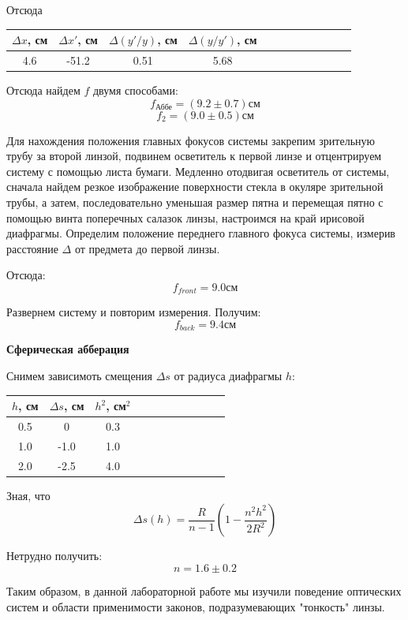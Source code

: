 \documentclass[14pt]{article}
\begin{document}
Отсюда
\begin{center}
\begin{tabular}{|c|c|c|c|c|c|c|c|c|c|c|c|}
\hline
$\Delta x$, см	&	$\Delta x'$, см	&	$\Delta(y'/y)$, см	&	$\Delta(y/y')$, см	\\
\hline
4.6				&	-51.2			&	0.51				&	5.68				\\
\hline
\end{tabular}
\end{center}

Отсюда найдем $f$ двумя способами:
$$
	f_{\text{Аббе}} = (9.2 \pm 0.7)\text{см}
$$
$$
	f_2 = (9.0 \pm 0.5)\text{см}
$$

Для нахождения положения главных фокусов системы закрепим зрительную
трубу за второй линзой, подвинем осветитель
к первой линзе и отцентрируем систему с помощью листа бумаги.
Медленно отодвигая осветитель от системы, сначала найдем резкое
изображение поверхности стекла в окуляре зрительной трубы,
а затем,
последовательно уменьшая размер пятна
и перемещая пятно с помощью
винта поперечных салазок линзы, настроимся на край ирисовой диафрагмы.
Определим положение переднего главного
фокуса системы, измерив расстояние $\Delta$ от предмета до первой линзы.

Отсюда:
$$
	f_{front} = 9.0\text{см}
$$

Развернем систему и повторим измерения. Получим:
$$
	f_{back} = 9.4\text{см}
$$

\vspace{1cm}
\textbf{Сферическая абберация} 

Снимем зависимоть смещения $\Delta s$ от радиуса диафрагмы $h$:
\begin{center}
\begin{tabular}{|c|c|c|c|c|c|c|c|c|c|c|}
\hline
$h$, см	&	$\Delta s$, см	&	$h^2$, см$^2$	\\
\hline
0.5		&	0				&	0.3				\\
\hline
1.0		&	-1.0			&	1.0				\\
\hline
2.0		&	-2.5			&	4.0				\\
\hline
\end{tabular}
\end{center}

\vspace{1cm}

Зная, что
$$
	\Delta s(h) = \frac{R}{n-1}\left(1 - \frac{n^2h^2}{2R^2}\right)
$$
	
Нетрудно получить:
$$
	n = 1.6 \pm 0.2
$$

\clearpage

Таким образом, в данной лабораторной работе мы изучили поведение оптических систем и области применимости законов, подразумевающих "тонкость" линзы.
\end{document}
